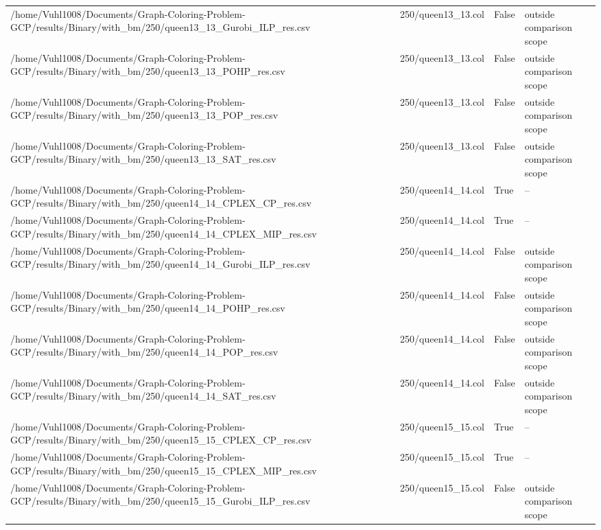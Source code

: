\begin{table}[htbp]
\begin{tabular}{llll}
/home/Vuhl1008/Documents/Graph-Coloring-Problem-GCP/results/Binary/with\_bm/250/queen13\_13\_Gurobi\_ILP\_res.csv & 250/queen13\_13.col & False & outside comparison scope \\
/home/Vuhl1008/Documents/Graph-Coloring-Problem-GCP/results/Binary/with\_bm/250/queen13\_13\_POHP\_res.csv & 250/queen13\_13.col & False & outside comparison scope \\
/home/Vuhl1008/Documents/Graph-Coloring-Problem-GCP/results/Binary/with\_bm/250/queen13\_13\_POP\_res.csv & 250/queen13\_13.col & False & outside comparison scope \\
/home/Vuhl1008/Documents/Graph-Coloring-Problem-GCP/results/Binary/with\_bm/250/queen13\_13\_SAT\_res.csv & 250/queen13\_13.col & False & outside comparison scope \\
/home/Vuhl1008/Documents/Graph-Coloring-Problem-GCP/results/Binary/with\_bm/250/queen14\_14\_CPLEX\_CP\_res.csv & 250/queen14\_14.col & True & -- \\
/home/Vuhl1008/Documents/Graph-Coloring-Problem-GCP/results/Binary/with\_bm/250/queen14\_14\_CPLEX\_MIP\_res.csv & 250/queen14\_14.col & True & -- \\
/home/Vuhl1008/Documents/Graph-Coloring-Problem-GCP/results/Binary/with\_bm/250/queen14\_14\_Gurobi\_ILP\_res.csv & 250/queen14\_14.col & False & outside comparison scope \\
/home/Vuhl1008/Documents/Graph-Coloring-Problem-GCP/results/Binary/with\_bm/250/queen14\_14\_POHP\_res.csv & 250/queen14\_14.col & False & outside comparison scope \\
/home/Vuhl1008/Documents/Graph-Coloring-Problem-GCP/results/Binary/with\_bm/250/queen14\_14\_POP\_res.csv & 250/queen14\_14.col & False & outside comparison scope \\
/home/Vuhl1008/Documents/Graph-Coloring-Problem-GCP/results/Binary/with\_bm/250/queen14\_14\_SAT\_res.csv & 250/queen14\_14.col & False & outside comparison scope \\
/home/Vuhl1008/Documents/Graph-Coloring-Problem-GCP/results/Binary/with\_bm/250/queen15\_15\_CPLEX\_CP\_res.csv & 250/queen15\_15.col & True & -- \\
/home/Vuhl1008/Documents/Graph-Coloring-Problem-GCP/results/Binary/with\_bm/250/queen15\_15\_CPLEX\_MIP\_res.csv & 250/queen15\_15.col & True & -- \\
/home/Vuhl1008/Documents/Graph-Coloring-Problem-GCP/results/Binary/with\_bm/250/queen15\_15\_Gurobi\_ILP\_res.csv & 250/queen15\_15.col & False & outside comparison scope \\

\end{tabular}
\end{table}
